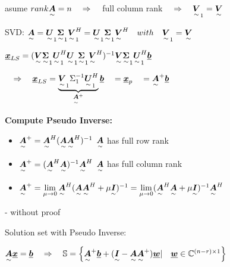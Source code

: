 asume $rank\ma{A}=n \pfeil$ full column rank $\pfeil \ma{V}_1=\ma{V}$

SVD: $\ma{A}=\ma{U}_1\ma{\Sigma}_1\ma{V}_1^H=\ma{U}_1\ma{\Sigma}_1\ma{V}^H \quad with \quad \ma{V}_1=\ma{V} $

$\vec{x}_{LS}=(\ma{V}\ma{\Sigma}_1\ma{U}_1^H\ma{U}_1\ma{\Sigma}_1\ma{V}^H)^{-1} \ma{V}\ma{\Sigma}_1\ma{U}_1^H \vec{b}$

$\pfeil\vec{x}_{LS}=\underbrace{\ma{V}_1\Sigma_1^{-1}\ma{U}_1^H}_{\ma{A}^+}\vec{b}   \quad = \vec{x}_p \quad = \ma{A}^+\vec{b}$ 


\textbf{Compute Pseudo Inverse:}
\begin{itemize}
\item $\ma{A}^+=\ma{A}^H(\ma{A}\ma{A}^H)^{-1}$ \quad $\ma{A}$ has full row rank
\item $\ma{A}^+=(\ma{A}^H\ma{A})^{-1}\ma{A}^H$ \quad $\ma{A}$ has full column rank
\item $\ma{A}^+=\lim\limits_{\mu\to 0} \ma{A}^H(\ma{A}\ma{A}^H+\mu\ma{I})^{-1}
=\lim\limits_{\mu\to 0} (\ma{A}^H\ma{A}+\mu\ma{I})^{-1}\ma{A}^H$
\end{itemize}

\begin{flushright}- without proof\end{flushright}

Solution set with Pseudo Inverse:

$\ma{A}\vec{x}=\vec{b}\pfeil \mathbb{S}=\left\lbrace\ma{A}^+\vec{b}+(\ma{I}-\ma{A}\ma{A}^+)\vec{w} |\quad \vec{w}\in \mathbb{C}^{(n-r)\times 1}  \right\rbrace$



